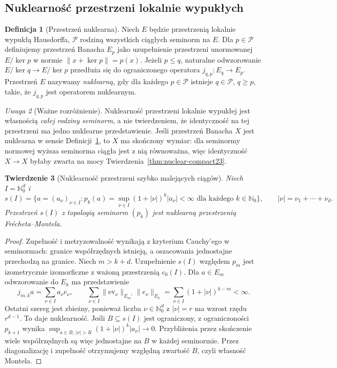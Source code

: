\documentclass[11pt,a4paper]{article}
\numberwithin{equation}{section}
\theoremstyle{plain}
\newtheorem{twierdzenie}{Twierdzenie}[section]
\theoremstyle{definition}
\newtheorem{definicja}[twierdzenie]{Definicja}
\theoremstyle{remark}
\newtheorem{uwaga}[twierdzenie]{Uwaga}
\newcommand{\N}{\mathbb N}
\begin{document}
\subsection{Nuklearność przestrzeni lokalnie wypukłych}

\begin{definicja}[Przestrzeń nuklearna]
\label{def:nuclear-lcs23}
Niech $E$ będzie przestrzenią lokalnie wypukłą Hausdorffa,
$\mathcal P$ rodziną wszystkich ciągłych seminorm na $E$.
Dla $p\in\mathcal P$ definiujemy przestrzeń Banacha $E_p$
jako uzupełnienie przestrzeni unormowanej $E/\ker p$
w normie $\|x+\ker p\|=p(x)$.
Jeżeli $p\le q$, naturalne odwzorowanie $E/\ker q\to E/\ker p$
przedłuża się do ograniczonego operatora
$j_{q,p}:E_q\to E_p$.
Przestrzeń $E$ nazywamy \emph{nuklearną}, gdy dla każdego
$p\in\mathcal P$ istnieje $q\in\mathcal P$, $q\ge p$,
takie, że $j_{q,p}$ jest operatorem nuklearnym.
\end{definicja}

\begin{uwaga}[Ważne rozróżnienie]
\label{rem:nuclear-different23}
Nuklearność przestrzeni lokalnie wypukłej jest własnością
\emph{całej rodziny seminorm}, a nie twierdzeniem,
że identyczność na tej przestrzeni ma jedno nuklearne
przedstawienie. Jeśli przestrzeń Banacha $X$ jest nuklearna
w sensie Definicji~\ref{def:nuclear-lcs23}, to $X$
ma skończony wymiar: dla seminormy normowej wyższa
seminorma ciągła jest z nią równoważna, więc identyczność
$X\to X$ byłaby zwarta na mocy
Twierdzenia~\ref{thm:nuclear-compact23}.
\end{uwaga}

\begin{twierdzenie}[Nuklearność przestrzeni szybko malejących ciągów]
\label{thm:nuclear-s23}
Niech $I=\N_0^d$ i
\[
 s(I)=\bigl\{a=(a_\nu)_{\nu\in I}:
 p_k(a)=\sup_{\nu\in I}(1+|\nu|)^k|a_\nu|<\infty
 \text{ dla każdego }k\in\N_0\bigr\},
 \qquad |\nu|=\nu_1+\cdots+\nu_d.
\]
Przestrzeń $s(I)$ z topologią seminorm $(p_k)$ jest
nuklearną przestrzenią Frécheta--Montela.
\end{twierdzenie}
\begin{proof}
Zupełność i metryzowalność wynikają z kryterium Cauchy'ego
w seminormach: granice współrzędnych istnieją, a oszacowania
jednostajne przechodzą na granice. Niech $m>k+d$.
Uzupełnienie $s(I)$ względem $p_m$ jest izometrycznie
izomorficzne z ważoną przestrzenią $c_0(I)$.
Dla $a\in E_m$ odwzorowanie do $E_k$ ma przedstawienie
\[
 j_{m,k}a=\sum_{\nu\in I}a_\nu e_\nu,
 \qquad
 \sum_{\nu\in I}\|\mathrm{ev}_\nu\|_{E_m'}
 \|e_\nu\|_{E_k}
 =\sum_{\nu\in I}(1+|\nu|)^{k-m}<\infty.
\]
Ostatni szereg jest zbieżny, ponieważ liczba
$\nu\in\N_0^d$ z $|\nu|=r$ ma wzrost rzędu $r^{d-1}$.
To daje nuklearność. Jeśli $B\subseteq s(I)$ jest
ograniczony, z ograniczoności $p_{k+1}$ wynika
$\sup_{a\in B,\,|\nu|>R}(1+|\nu|)^k|a_\nu|\to0$.
Przybliżenia przez skończenie wiele współrzędnych są
więc jednostajne na $B$ w każdej seminormie.
Przez diagonalizację i zupełność otrzymujemy względną
zwartość $B$, czyli własność Montela.
\end{proof}
\end{document}
